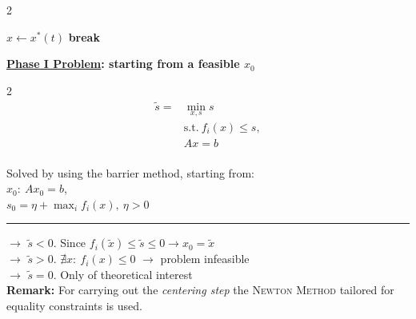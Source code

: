 \documentclass[a4paper]{article}
\begin{document}
\begin{multicols}{2}
\begin{algorithm}[H]
\begin{algorithmic}[1]
                \State $x{\gets}x^*(t)$
                  
                    \State \textbf{break}
                \Else  {} 
                \EndIf
            \EndLoop
        \end{algorithmic}
    \end{algorithm}
    \vspace{-0.3cm}
    \noindent
    \textbf{\underline{Phase I Problem}: starting from a feasible $x_0$} 
    \vspace{-0.3cm}
    \begin{multicols}{2}
        \begin{align*}
            \tilde{s}=&\min_{x,s} {s}\\
            &\text{s.t.} \ f_i(x)\le{s}, \\
            &Ax=b
        \end{align*}
        \newcolumn\\
        Solved by using the barrier method, starting from:\\
        $x_0: \ Ax_0=b$,    \\
        $s_0=\eta+\max_{i}{f_i(x)}, \ \eta>0$
    \end{multicols}
    \vspace{-0.8cm}
    \hrule
    \vspace{0.1cm}
    \noindent
    $\to$ $\tilde{s}<0$. Since $f_i(\tilde{x})\le\tilde{s}\le0 \longrightarrow x_0=\tilde{x}$\\
    $\to$ $\tilde{s}>0$. $\nexists{x}: \ f_i(x)\le0$ $\longrightarrow$ problem infeasible\\
    $\to$ $\tilde{s}=0$. Only of theoretical interest\\

    \noindent
    \textbf{Remark:} For carrying out the \textit{centering step} the \textsc{Newton Method} tailored for equality constraints is used.
\end{multicols}
\end{document}
